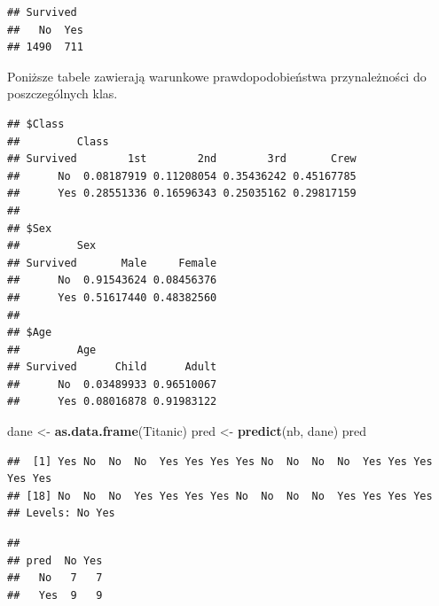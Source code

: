 \documentclass[]{book}
\newenvironment{Shaded}{\begin{snugshade}}{\end{snugshade}}
\newcommand{\KeywordTok}[1]{\textcolor[rgb]{0.13,0.29,0.53}{\textbf{#1}}}
\newcommand{\NormalTok}[1]{#1}
\newcommand{\OperatorTok}[1]{\textcolor[rgb]{0.81,0.36,0.00}{\textbf{#1}}}
\newcommand{\StringTok}[1]{\textcolor[rgb]{0.31,0.60,0.02}{#1}}
\theoremstyle{plain}
\theoremstyle{definition}
\theoremstyle{definition}
\theoremstyle{definition}
\theoremstyle{definition}
\theoremstyle{remark}
\begin{document}
\begin{verbatim}
## Survived
##   No  Yes 
## 1490  711
\end{verbatim}

Poniższe tabele zawierają warunkowe prawdopodobieństwa przynależności do poszczególnych klas.

\begin{Shaded}
\end{Shaded}

\begin{verbatim}
## $Class
##         Class
## Survived        1st        2nd        3rd       Crew
##      No  0.08187919 0.11208054 0.35436242 0.45167785
##      Yes 0.28551336 0.16596343 0.25035162 0.29817159
## 
## $Sex
##         Sex
## Survived       Male     Female
##      No  0.91543624 0.08456376
##      Yes 0.51617440 0.48382560
## 
## $Age
##         Age
## Survived      Child      Adult
##      No  0.03489933 0.96510067
##      Yes 0.08016878 0.91983122
\end{verbatim}

\begin{Shaded}
\begin{Highlighting}[]
\NormalTok{dane <-}\StringTok{ }\KeywordTok{as.data.frame}\NormalTok{(Titanic)}
\NormalTok{pred <-}\StringTok{ }\KeywordTok{predict}\NormalTok{(nb, dane)}
\NormalTok{pred}
\end{Highlighting}
\end{Shaded}

\begin{verbatim}
##  [1] Yes No  No  No  Yes Yes Yes Yes No  No  No  No  Yes Yes Yes Yes Yes
## [18] No  No  No  Yes Yes Yes Yes No  No  No  No  Yes Yes Yes Yes
## Levels: No Yes
\end{verbatim}

\begin{Shaded}
\end{Shaded}

\begin{verbatim}
##      
## pred  No Yes
##   No   7   7
##   Yes  9   9
\end{verbatim}
\end{document}
